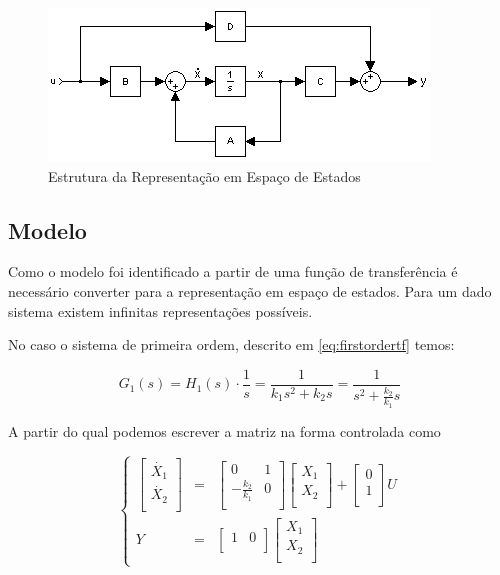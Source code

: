 \documentclass[a4paper,11pt]{article}
\begin{document}
\begin{figure}[H]
    \centering
    \includegraphics{tex/img/space_state_model.png}
    \caption{Estrutura da Representação em Espaço de Estados}
    \label{fig:space_state_model}
\end{figure}

\subsection{Modelo}
Como o modelo foi identificado a partir de uma função de transferência é necessário converter para a representação em espaço de estados. Para um dado sistema existem infinitas representações possíveis.

No caso o sistema de primeira ordem, descrito em \ref{eq:firstordertf} temos:

$$
G_1(s) = H_1(s)\cdot \frac{1}{s} = \frac{1}{k_1 s^2+ k_2 s} = \frac{1}{s^2+ \frac{k_2}{k_1} s}
$$

A partir do qual podemos escrever a matriz na forma controlada como

\begin{equation}
\left\{
\begin{array}{rcl}
\left[\begin{array}{c}
    \dot{X_1} \\
    \dot{X_2} \\
\end{array}
\right]
&
=
&
\left[
\begin{array}{cc}
    0 & 1 \\
    -\frac{k_2}{k_1} & 0 \\ 
\end{array}
\right]
\left[\begin{array}{c}
    X_1 \\
    X_2 \\
\end{array}
\right]
+
\left[\begin{array}{c}
    0 \\
    1 \\
\end{array}
\right]
U\\
Y & = &\left[
\begin{array}{cc}
    1 & 0 \\
\end{array}
\right]
\left[\begin{array}{c}
    X_1 \\
    X_2 \\
\end{array}
\right]
\end{array}
\right.
\end{equation}
\end{document}
